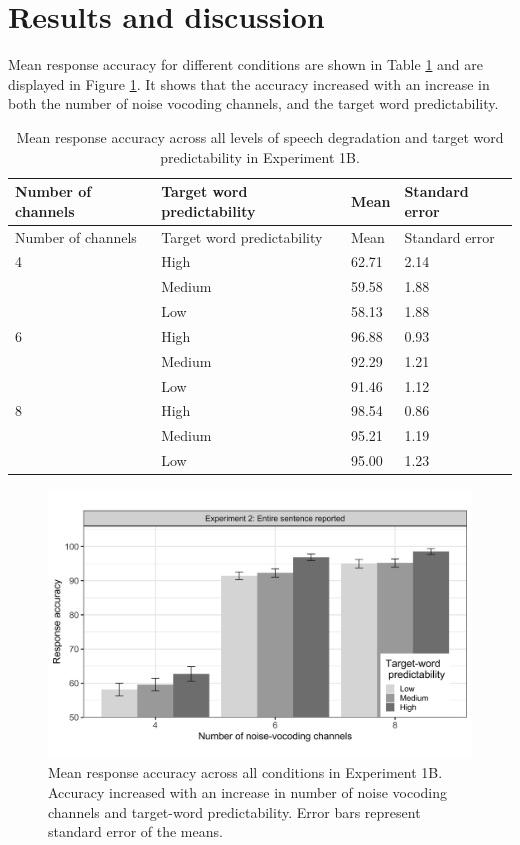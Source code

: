 \documentclass[a4paper, nobind]{templates/ociamthesis}
\begin{document}
\hypertarget{results-and-discussion-1}{%
\section{Results and discussion}\label{results-and-discussion-1}}

Mean response accuracy for different conditions are shown in Table \ref{summary1b} and are displayed in Figure \ref{fig:figure1b}.
It shows that the accuracy increased with an increase in both the number of noise vocoding channels, and the target word predictability.

\begin{longtable}[]{@{}llll@{}}
\caption{Mean response accuracy across all levels of speech degradation
and target word predictability in Experiment 1B.}
\label{summary1b}
\tabularnewline
\toprule
Number of channels & Target word predictability & Mean & Standard
error \\
\midrule
\endfirsthead
\toprule
Number of channels & Target word predictability & Mean & Standard
error \\
\midrule
\endhead
4 & High & 62.71 & 2.14 \\
& Medium & 59.58 & 1.88 \\
& Low & 58.13 & 1.88 \\
6 & High & 96.88 & 0.93 \\
& Medium & 92.29 & 1.21 \\
& Low & 91.46 & 1.12 \\
8 & High & 98.54 & 0.86 \\
& Medium & 95.21 & 1.19 \\
& Low & 95.00 & 1.23 \\
\bottomrule
\end{longtable}

\begin{figure}

{\centering \includegraphics[width=0.95\linewidth]{figures/results-fig/expt-1b} 

}

\caption{Mean response accuracy across all conditions in Experiment 1B. Accuracy increased with an increase in number of noise vocoding channels and target-word predictability. Error bars represent standard error of the means.}\label{fig:figure1b}
\end{figure}
\end{document}
